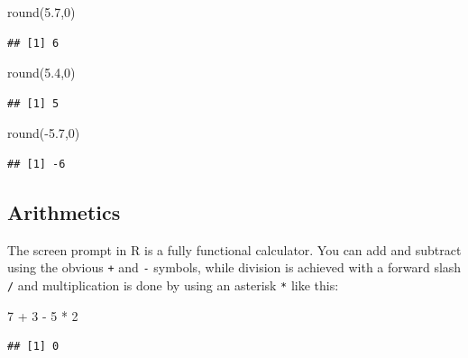 \documentclass[
]{book}
\newenvironment{Shaded}{\begin{snugshade}}{\end{snugshade}}
\newcommand{\DecValTok}[1]{\textcolor[rgb]{0.00,0.00,0.81}{#1}}
\newcommand{\FloatTok}[1]{\textcolor[rgb]{0.00,0.00,0.81}{#1}}
\newcommand{\FunctionTok}[1]{\textcolor[rgb]{0.00,0.00,0.00}{#1}}
\newcommand{\NormalTok}[1]{#1}
\newcommand{\SpecialCharTok}[1]{\textcolor[rgb]{0.00,0.00,0.00}{#1}}
\begin{document}
\begin{Shaded}
\begin{Highlighting}[]
\FunctionTok{round}\NormalTok{(}\FloatTok{5.7}\NormalTok{,}\DecValTok{0}\NormalTok{)}
\end{Highlighting}
\end{Shaded}

\begin{verbatim}
## [1] 6
\end{verbatim}

\begin{Shaded}
\begin{Highlighting}[]
\FunctionTok{round}\NormalTok{(}\FloatTok{5.4}\NormalTok{,}\DecValTok{0}\NormalTok{)}
\end{Highlighting}
\end{Shaded}

\begin{verbatim}
## [1] 5
\end{verbatim}

\begin{Shaded}
\begin{Highlighting}[]
\FunctionTok{round}\NormalTok{(}\SpecialCharTok{{-}}\FloatTok{5.7}\NormalTok{,}\DecValTok{0}\NormalTok{)}
\end{Highlighting}
\end{Shaded}

\begin{verbatim}
## [1] -6
\end{verbatim}

\hypertarget{arithmetics}{%
\subsection{Arithmetics}\label{arithmetics}}

The screen prompt in R is a fully functional calculator. You can add and subtract using the obvious \texttt{+} and \texttt{-} symbols, while division is achieved with a forward slash \texttt{/} and multiplication is done by using an asterisk \texttt{*} like this:

\begin{Shaded}
\begin{Highlighting}[]
\DecValTok{7} \SpecialCharTok{+} \DecValTok{3} \SpecialCharTok{{-}} \DecValTok{5} \SpecialCharTok{*} \DecValTok{2}
\end{Highlighting}
\end{Shaded}

\begin{verbatim}
## [1] 0
\end{verbatim}
\end{document}
